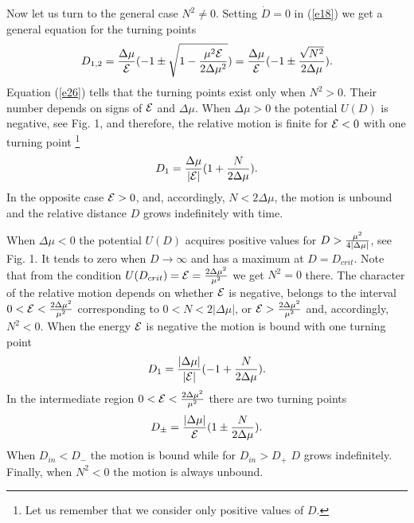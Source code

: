 \documentclass[aip,nofootinbib]{revtex4}
\begin{document}
Now let us turn to the general case $N^{2} \ne 0$. Setting $\dot
D=0$ in (\ref{e18}) we get a general equation for the turning
points
\begin{equation}
D_{1,2}={\Delta \mu \over {\cal E}}(-1\pm \sqrt{1-{\mu^{2}{\cal
E}\over 2\Delta \mu^2}})={\Delta \mu \over {\cal E}}(-1\pm
{\sqrt{N^2}\over 2\Delta \mu }). \label{e26}
\end{equation}
Equation (\ref{e26}) tells that the turning points exist only when
$N^{2} > 0$. Their number depends on signs of ${\cal E}$ and
$\Delta \mu $. When $\Delta \mu > 0$ the potential $U(D)$ is
negative, see Fig. 1, and therefore, the relative motion is finite
for ${\cal E} < 0$ with one turning point \footnote{Let us
remember that we consider only positive values of $D$.}
\begin{equation}
D_{1}={\Delta \mu \over |{\cal E}|}(1+{N\over 2\Delta \mu}).
\label{en26}
\end{equation}
In the opposite case ${\cal E} > 0$, and, accordingly, $N <
2\Delta \mu $, the motion is unbound and the relative distance $D$
grows indefinitely with time.

When $\Delta \mu < 0$ the potential $U(D)$ acquires positive
values for $D > {\mu^{2}\over 4|\Delta \mu |}$, see Fig. 1. It
tends to zero when $D \rightarrow \infty $ and has a maximum at
$D=D_{crit}$. Note that from the condition $U(D_{crit})={\cal
E}={2\Delta \mu^2\over \mu^2}$ we get $N^{2}=0$ there. The
character of the relative motion depends on whether ${\cal E}$ is
negative, belongs to the interval $0 < {\cal E} < {2\Delta
\mu^2\over \mu^2}$ corresponding to $0 < N < 2|\Delta \mu |$, or
${\cal E} > {2\Delta \mu^2\over \mu^2}$ and, accordingly, $N^{2} <
0$. When the energy ${\cal E}$ is negative the motion is bound
with one turning point
\begin{equation}
D_{1}={|\Delta \mu |\over |{\cal E}|}(-1+ {N\over 2\Delta
\mu}).\label{e27}
\end{equation}
In the intermediate region $0 < {\cal E} < {2\Delta \mu^2\over
\mu^2}$ there are two turning points
\begin{equation}
D_{\pm}={|\Delta \mu | \over {\cal E}}(1\pm {N\over 2\Delta
\mu}).\label{en27}
\end{equation}
When $D_{in} < D_{-}$ the motion is bound while for $D_{in} >
D_{+}$ $D$ grows indefinitely. Finally, when $N^{2} < 0$ the
motion is always unbound.
\end{document}
